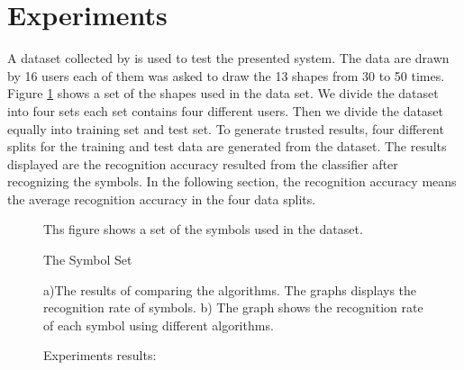 \documentclass[a4paper,10pt]{IEEEconf}
\begin{document}
\section{Experiments}\label{sec:Experiments}
A dataset collected by \citeauthor{HeloiseBeautification} is used to test the presented system\cite{HeloiseBeautification}. The data are drawn by 16 users each of them was asked to draw the 13 shapes from 30 to 50 times. Figure \ref{fig:symbolSet} shows a set of the shapes used in the data set. We divide the dataset into four sets each set contains four different users. Then we divide the dataset equally into training set and test set. To generate trusted results, four different splits for the training and test data are generated from the dataset. The results displayed are the recognition accuracy resulted from the classifier after recognizing the symbols. In the following section, the recognition accuracy means the average recognition accuracy in the four data splits. %
\begin{figure}[]\centering
{}
	\caption{The Symbol Set} Ths figure shows a set of the symbols used in the dataset. 
	\label{fig:symbolSet}
\end{figure}
\begin{figure*}[]
	\centering
		\hfill
	\caption{Experiments results:}  a)The results of comparing the algorithms. The graphs displays the recognition rate of symbols. b) The graph shows the recognition rate of each symbol using different algorithms.
\end{figure*}
\end{document}
